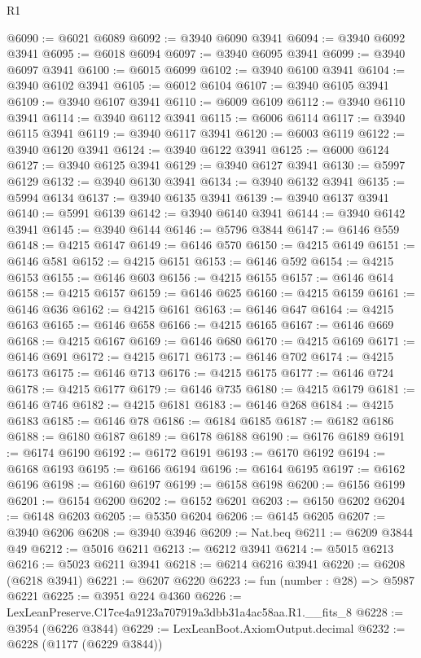 \begin{lexlean}{R1}
\begin{coremodule}
@6090 := @6021 @6089
@6092 := @3940 @6090 @3941
@6094 := @3940 @6092 @3941
@6095 := @6018 @6094
@6097 := @3940 @6095 @3941
@6099 := @3940 @6097 @3941
@6100 := @6015 @6099
@6102 := @3940 @6100 @3941
@6104 := @3940 @6102 @3941
@6105 := @6012 @6104
@6107 := @3940 @6105 @3941
@6109 := @3940 @6107 @3941
@6110 := @6009 @6109
@6112 := @3940 @6110 @3941
@6114 := @3940 @6112 @3941
@6115 := @6006 @6114
@6117 := @3940 @6115 @3941
@6119 := @3940 @6117 @3941
@6120 := @6003 @6119
@6122 := @3940 @6120 @3941
@6124 := @3940 @6122 @3941
@6125 := @6000 @6124
@6127 := @3940 @6125 @3941
@6129 := @3940 @6127 @3941
@6130 := @5997 @6129
@6132 := @3940 @6130 @3941
@6134 := @3940 @6132 @3941
@6135 := @5994 @6134
@6137 := @3940 @6135 @3941
@6139 := @3940 @6137 @3941
@6140 := @5991 @6139
@6142 := @3940 @6140 @3941
@6144 := @3940 @6142 @3941
@6145 := @3940 @6144
@6146 := @5796 @3844
@6147 := @6146 @559
@6148 := @4215 @6147
@6149 := @6146 @570
@6150 := @4215 @6149
@6151 := @6146 @581
@6152 := @4215 @6151
@6153 := @6146 @592
@6154 := @4215 @6153
@6155 := @6146 @603
@6156 := @4215 @6155
@6157 := @6146 @614
@6158 := @4215 @6157
@6159 := @6146 @625
@6160 := @4215 @6159
@6161 := @6146 @636
@6162 := @4215 @6161
@6163 := @6146 @647
@6164 := @4215 @6163
@6165 := @6146 @658
@6166 := @4215 @6165
@6167 := @6146 @669
@6168 := @4215 @6167
@6169 := @6146 @680
@6170 := @4215 @6169
@6171 := @6146 @691
@6172 := @4215 @6171
@6173 := @6146 @702
@6174 := @4215 @6173
@6175 := @6146 @713
@6176 := @4215 @6175
@6177 := @6146 @724
@6178 := @4215 @6177
@6179 := @6146 @735
@6180 := @4215 @6179
@6181 := @6146 @746
@6182 := @4215 @6181
@6183 := @6146 @268
@6184 := @4215 @6183
@6185 := @6146 @78
@6186 := @6184 @6185
@6187 := @6182 @6186
@6188 := @6180 @6187
@6189 := @6178 @6188
@6190 := @6176 @6189
@6191 := @6174 @6190
@6192 := @6172 @6191
@6193 := @6170 @6192
@6194 := @6168 @6193
@6195 := @6166 @6194
@6196 := @6164 @6195
@6197 := @6162 @6196
@6198 := @6160 @6197
@6199 := @6158 @6198
@6200 := @6156 @6199
@6201 := @6154 @6200
@6202 := @6152 @6201
@6203 := @6150 @6202
@6204 := @6148 @6203
@6205 := @5350 @6204
@6206 := @6145 @6205
@6207 := @3940 @6206
@6208 := @3940 @3946
@6209 := Nat.beq
@6211 := @6209 @3844 @49
@6212 := @5016 @6211
@6213 := @6212 @3941
@6214 := @5015 @6213
@6216 := @5023 @6211 @3941
@6218 := @6214 @6216 @3941
@6220 := @6208 (@6218 @3941)
@6221 := @6207 @6220
@6223 := fun (number : @28) => @5987 @6221
@6225 := @3951 @224 @4360
@6226 := LexLeanPreserve.C17ce4a9123a707919a3dbb31a4ac58aa.R1.__fits_8
@6228 := @3954 (@6226 @3844)
@6229 := LexLeanBoot.AxiomOutput.decimal
@6232 := @6228 (@1177 (@6229 @3844))

\end{coremodule}
\end{lexlean}
